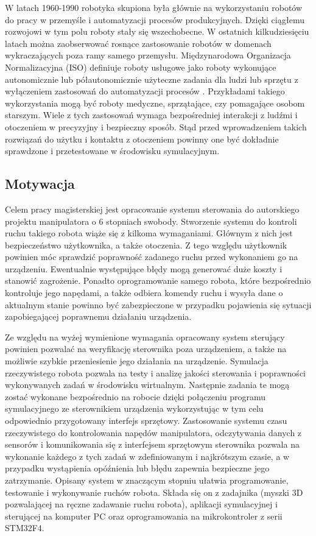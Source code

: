 \documentclass[a4paper, 12pt, twoside]{article}
\begin{document}
W latach 1960-1990 robotyka skupiona była głównie na wykorzystaniu robotów do pracy w przemyśle i automatyzacji procesów produkcyjnych. Dzięki ciągłemu rozwojowi w tym polu roboty stały się wszechobecne. W ostatnich kilkudziesięciu latach można zaobserwować rosnące zastosowanie robotów w domenach wykraczających poza ramy samego przemysłu. Międzynarodowa Organizacja Normalizacyjna (ISO) definiuje roboty usługowe jako roboty wykonujące autonomicznie lub półautonomicznie użyteczne zadania dla ludzi lub sprzętu z wyłączeniem zastosowań do automatyzacji procesów \cite{isodef}. Przykładami takiego wykorzystania mogą być roboty medyczne, sprzątające, czy pomagające osobom starszym. Wiele z tych zastosowań wymaga bezpośredniej interakcji z ludźmi i otoczeniem w precyzyjny i bezpieczny sposób. Stąd przed wprowadzeniem takich rozwiązań do użytku i kontaktu z otoczeniem powinny one być dokładnie sprawdzone i przetestowane w środowisku symulacyjnym. 

\subsection{Motywacja}

Celem pracy magisterskiej jest opracowanie systemu sterowania do autorskiego projektu manipulatora o 6 stopniach swobody. Stworzenie systemu do kontroli ruchu takiego robota wiąże się z kilkoma wymaganiami. Głównym z nich jest bezpieczeństwo użytkownika, a także otoczenia. Z tego względu użytkownik powinien móc sprawdzić poprawność zadanego ruchu przed wykonaniem go na urządzeniu. Ewentualnie występujące błędy mogą generować duże koszty i stanowić zagrożenie. Ponadto oprogramowanie samego robota, które bezpośrednio kontroluje jego napędami, a także odbiera komendy ruchu i wysyła dane o aktualnym stanie powinno być zabezpieczone w przypadku pojawienia się sytuacji zapobiegającej poprawnemu działaniu urządzenia. 

Ze względu na wyżej wymienione wymagania opracowany system sterujący powinien pozwalać na weryfikację sterownika poza urządzeniem, a także na możliwie szybkie przeniesienie jego działania na urządzenie. Symulacja rzeczywistego robota pozwala na testy i analizę jakości sterowania i poprawności wykonywanych zadań w środowisku wirtualnym. Następnie zadania te mogą zostać wykonane bezpośrednio na robocie dzięki połączeniu programu symulacyjnego ze sterownikiem urządzenia wykorzystując w tym celu odpowiednio przygotowany interfejs sprzętowy. Zastosowanie systemu czasu rzeczywistego do kontrolowania napędów manipulatora, odczytywania danych z sensorów i komunikowania się z interfejsem sprzętowym sterownika pozwala na wykonanie każdego z tych zadań w zdefiniowanym i najkrótszym czasie, a w przypadku wystąpienia opóźnienia lub błędu zapewnia bezpieczne jego zatrzymanie. Opisany system w znaczącym stopniu ułatwia programowanie, testowanie i wykonywanie ruchów robota. Składa się on z zadajnika (myszki 3D pozwalającej na ręczne zadawanie ruchu robota), aplikacji symulacyjnej i sterującej na komputer PC oraz oprogramowania na mikrokontroler z serii STM32F4.
\end{document}
